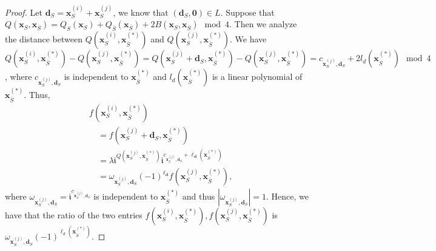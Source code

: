 \begin{proof}
    Let $\mathbf{d}_S=\mathbf{x}_S^{(i)}+\mathbf{x}_S^{(j)}$, we know that $(\mathbf{d}_S,\mathbf{0})\in L$. Suppose that $Q(\mathbf{x}_S,\mathbf{x}_{\overline{S}})=Q_S(\mathbf{x}_S)+Q_{\overline{S}}(\mathbf{x}_{\overline{S}})+2B(\mathbf{x}_S,\mathbf{x}_{\overline{S}}) \mod 4$. Then we analyze the distance between $Q(\mathbf{x}_S^{(i)},\mathbf{x}_{\overline{S}}^{(*)})$ and $Q(\mathbf{x}_S^{(j)},\mathbf{x}_{\overline{S}}^{(*)})$. We have $Q(\mathbf{x}_S^{(i)},\mathbf{x}_{\overline{S}}^{(*)})-Q(\mathbf{x}_S^{(j)},\mathbf{x}_{\overline{S}}^{(*)})=Q(\mathbf{x}_S^{(j)}+\mathbf{d}_S,\mathbf{x}_{\overline{S}}^{(*)})-Q(\mathbf{x}_S^{(j)},\mathbf{x}_{\overline{S}}^{(*)})=c_{\mathbf{x}_S^{(j)},\mathbf{d}_S}+2l_d(\mathbf{x}_{\overline{S}}^{(*)})\mod 4$, where $c_{\mathbf{x}_S^{(j)},\mathbf{d}_S}$ is independent to $\mathbf{x}_{\overline{S}}^{(*)}$ and $l_d(\mathbf{x}_{\overline{S}}^{(*)})$ is a linear polynomial of $\mathbf{x}_{\overline{S}}^{(*)}$. Thus, 
    \begin{equation*}
\begin{aligned}
&f\left(
  \mathbf{x}_S^{(i)},
  \mathbf{x}_{\overline S}^{(*)}
 \right)                                                     \\
&\quad =
 f\left(
  \mathbf{x}_S^{(j)}+\mathbf d_S,
  \mathbf{x}_{\overline S}^{(*)}
 \right)                                                     \\
&\quad =
 \lambda
 \mathfrak{i}^{
   Q\left(
     \mathbf{x}_S^{(j)},
     \mathbf{x}_{\overline S}^{(*)}
   \right)
 }
 \mathfrak{i}^{
   c_{\mathbf{x}_S^{(j)},\mathbf d_S}
   +\ell_{\mathbf d}\left(
      \mathbf{x}_{\overline S}^{(*)}
    \right) 
 }\\
 &\quad =
 \omega_{\mathbf{x}_S^{(j)},\mathbf d_S}(-1)^{\ell_{\mathbf d}}f\left(
     \mathbf{x}_S^{(j)},
     \mathbf{x}_{\overline S}^{(*)}
   \right),
\end{aligned}
\end{equation*}
where $\omega_{\mathbf{x}_S^{(j)},\mathbf d_S}=\mathfrak{i}^{c_{\mathbf{x}_S^{(j)},\mathbf d_S}}$ is independent to $\mathbf{x}_{\overline{S}}^{(*)}$ and thus $|\omega_{\mathbf{x}_S^{(j)},\mathbf d_S}|=1$. Hence, we have that the ratio of the two entries $f\left(
  \mathbf{x}_S^{(i)},
  \mathbf{x}_{\overline S}^{(*)}
 \right)  ,f\left(
     \mathbf{x}_S^{(j)},
     \mathbf{x}_{\overline S}^{(*)}
   \right)$ is $\omega_{\mathbf{x}_S^{(j)},\mathbf d_S}(-1)^{\ell_d(\mathbf{x}_{\overline{S}}^{(*)})}$.


\end{proof}

